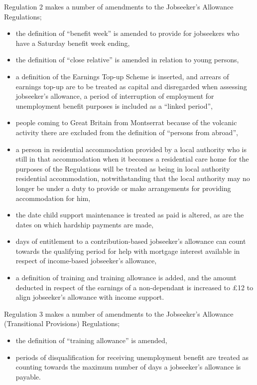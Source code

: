 \documentclass[a4paper]{article}
\begin{document}
  Regulation 2 makes a number of amendments to the Jobseeker’s Allowance Regulations;
\begin{itemize}
\item the definition of “benefit week” is amended to provide for jobseekers who have a Saturday benefit week ending,
\item the definition of “close relative” is amended in relation to young persons,
\item a definition of the Earnings Top-up Scheme is inserted, and arrears of earnings top-up are to be treated as capital and disregarded when assessing jobseeker’s allowance,
a period of interruption of employment for unemployment benefit purposes is included as a “linked period”,
\item people coming to Great Britain from Montserrat because of the volcanic activity there are excluded from the definition of “persons from abroad”,
\item a person in residential accommodation provided by a local authority who is still in that accommodation when it becomes a residential care home for the purposes of the Regulations will be treated as being in local authority residential accommodation, notwithstanding that the local authority may no longer be under a duty to provide or make arrangements for providing accommodation for him,
\item the date child support maintenance is treated as paid is altered, as are the dates on which hardship payments are made,
\item days of entitlement to a contribution-based jobseeker’s allowance can count towards the qualifying period for help with mortgage interest available in respect of income-based jobseeker’s allowance,
\item a definition of training and training allowance is added, and the amount deducted in respect of the earnings of a non-dependant is increased to £12 to align jobseeker’s allowance with income support.
\end{itemize}

  Regulation 3 makes a number of amendments to the Jobseeker’s Allowance (Transitional Provisions) Regulations;
\begin{itemize}
\item the definition of “training allowance” is amended,
\item periods of disqualification for receiving unemployment benefit are treated as counting towards the maximum number of days a jobseeker’s allowance is payable.
\end{itemize}
\end{document}
